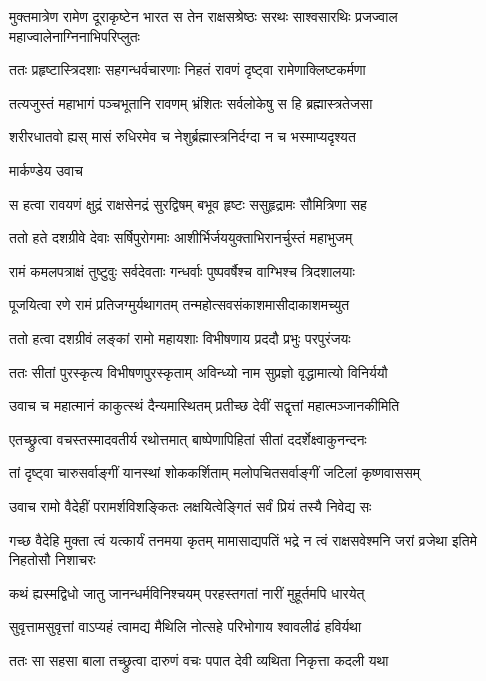 \threelineshloka
{मुक्तमात्रेण रामेण दूराकृष्टेन भारत}
{स तेन राक्षसश्रेष्ठः सरथः साश्वसारथिः}
{प्रजज्वाल महाज्वालेनाग्निनाभिपरिप्लुतः}


\twolineshloka
{ततः प्रहृष्टास्त्रिदशाः सहगन्धर्वचारणाः}
{निहतं रावणं दृष्ट्वा रामेणाक्लिष्टकर्मणा}


\twolineshloka
{तत्यजुस्तं महाभागं पञ्चभूतानि रावणम्}
{भ्रंशितः सर्वलोकेषु स हि ब्रह्मास्त्रतेजसा}


\twolineshloka
{शरीरधातवो ह्यस् मासं रुधिरमेव च}
{नेशुर्ब्रह्मास्त्रनिर्दग्दा न च भस्माप्यदृश्यत}


\twolineshloka
{मार्कण्डेय उवाच}
{}


\twolineshloka
{स हत्वा रावयणं क्षुद्रं राक्षसेनद्रं सुरद्विषम्}
{बभूव हृष्टः ससुहृद्रामः सौमित्रिणा सह}


\twolineshloka
{ततो हते दशग्रीवे देवाः सर्षिपुरोगमाः}
{आशीर्भिर्जययुक्ताभिरानर्चुस्तं महाभुजम्}


\twolineshloka
{रामं कमलपत्राक्षं तुष्टुवुः सर्वदेवताः}
{गन्धर्वाः पुष्पवर्षैश्च वाग्भिश्च त्रिदशालयाः}


\twolineshloka
{पूजयित्वा रणे रामं प्रतिजग्मुर्यथागतम्}
{तन्महोत्सवसंकाशमासीदाकाशमच्युत}


\twolineshloka
{ततो हत्वा दशग्रीवं लङ्कां रामो महायशाः}
{विभीषणाय प्रददौ प्रभुः परपुरंजयः}


\twolineshloka
{ततः सीतां पुरस्कृत्य विभीषणपुरस्कृताम्}
{अविन्ध्यो नाम सुप्रज्ञो वृद्धामात्यो विनिर्ययौ}


\twolineshloka
{उवाच च महात्मानं काकुत्स्थं दैन्यमास्थितम्}
{प्रतीच्छ देवीं सद्वृत्तां महात्मञ्जानकीमिति}


\twolineshloka
{एतच्छ्रुत्वा वचस्तस्मादवतीर्य रथोत्तमात्}
{बाष्पेणापिहितां सीतां ददर्शेक्ष्वाकुनन्दनः}


\twolineshloka
{तां दृष्ट्वा चारुसर्वाङ्गीं यानस्थां शोककर्शिताम्}
{मलोपचितसर्वाङ्गीं जटिलां कृष्णवाससम्}


\twolineshloka
{उवाच रामो वैदेहीं परामर्शविशङ्कितः}
{लक्षयित्वेङ्गितं सर्वं प्रियं तस्यै निवेद्य सः}


\threelineshloka
{गच्छ वैदेहि मुक्ता त्वं यत्कार्यं तनमया कृतम्}
{मामासाद्यपतिं भद्रे न त्वं राक्षसवेश्मनि}
{जरां व्रजेथा इतिमे निहतोसौ निशाचरः}


\twolineshloka
{कथं ह्यस्मद्विधो जातु जानन्धर्मविनिश्चयम्}
{परहस्तगतां नारीं मुहूर्तमपि धारयेत्}


\twolineshloka
{सुवृत्तामसुवृत्तां वाऽप्यहं त्वामद्य मैथिलि}
{नोत्सहे परिभोगाय श्वावलीढं हविर्यथा}


\twolineshloka
{ततः सा सहसा बाला तच्छ्रुत्वा दारुणं वचः}
{पपात देवी व्यथिता निकृत्ता कदली यथा}


